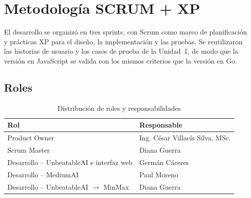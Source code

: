 \documentclass[12pt,a4paper]{article}
\begin{document}
\section{Metodología SCRUM + XP}
El desarrollo se organizó en tres sprints, con Scrum como marco de planificación
y prácticas XP para el diseño, la implementación y las pruebas. Se reutilizaron
las historias de usuario y los casos de prueba de la Unidad~1, de modo que la
versión en JavaScript se valida con los mismos criterios que la versión en Go.

\subsection{Roles}
\begin{table}[H]
\centering
\caption{Distribución de roles y responsabilidades}
\begin{tabular}{ll}
\toprule
\textbf{Rol} & \textbf{Responsable}\\
\midrule
Product Owner & Ing. César Villacís Silva, MSc.\\
Scrum Master & Diana Guerra\\
Desarrollo -- UnbeatableAI e interfaz web & Germán Cáceres\\
Desarrollo -- MediumAI & Paul Moreno\\
Desarrollo -- UnbeatableAI $\rightarrow$ MinMax & Diana Guerra\\
\bottomrule
\end{tabular}
\end{table}
\end{document}
